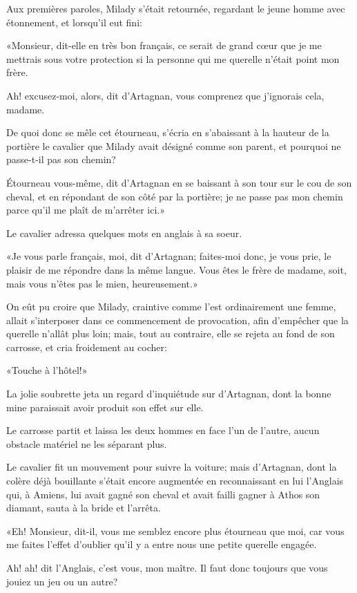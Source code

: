 Aux premières paroles, Milady s'était retournée, regardant le jeune homme avec étonnement, et lorsqu'il eut fini: 

«Monsieur, dit-elle en très bon français, ce serait de grand cœur que je me mettrais sous votre protection si la personne qui me querelle n'était point mon frère. 

\speak  Ah! excusez-moi, alors, dit d'Artagnan, vous comprenez que j'ignorais cela, madame. 

\speak  De quoi donc se mêle cet étourneau, s'écria en s'abaissant à la hauteur de la portière le cavalier que Milady avait désigné comme son parent, et pourquoi ne passe-t-il pas son chemin? 

\speak  Étourneau vous-même, dit d'Artagnan en se baissant à son tour sur le cou de son cheval, et en répondant de son côté par la portière; je ne passe pas mon chemin parce qu'il me plaît de m'arrêter ici.» 

Le cavalier adressa quelques mots en anglais à sa soeur. 

«Je vous parle français, moi, dit d'Artagnan; faites-moi donc, je vous prie, le plaisir de me répondre dans la même langue. Vous êtes le frère de madame, soit, mais vous n'êtes pas le mien, heureusement.» 

On eût pu croire que Milady, craintive comme l'est ordinairement une femme, allait s'interposer dans ce commencement de provocation, afin d'empêcher que la querelle n'allât plus loin; mais, tout au contraire, elle se rejeta au fond de son carrosse, et cria froidement au cocher: 

«Touche à l'hôtel!» 

La jolie soubrette jeta un regard d'inquiétude sur d'Artagnan, dont la bonne mine paraissait avoir produit son effet sur elle. 

Le carrosse partit et laissa les deux hommes en face l'un de l'autre, aucun obstacle matériel ne les séparant plus. 

Le cavalier fit un mouvement pour suivre la voiture; mais d'Artagnan, dont la colère déjà bouillante s'était encore augmentée en reconnaissant en lui l'Anglais qui, à Amiens, lui avait gagné son cheval et avait failli gagner à Athos son diamant, sauta à la bride et l'arrêta. 

«Eh! Monsieur, dit-il, vous me semblez encore plus étourneau que moi, car vous me faites l'effet d'oublier qu'il y a entre nous une petite querelle engagée. 

\speak  Ah! ah! dit l'Anglais, c'est vous, mon maître. Il faut donc toujours que vous jouiez un jeu ou un autre? 


